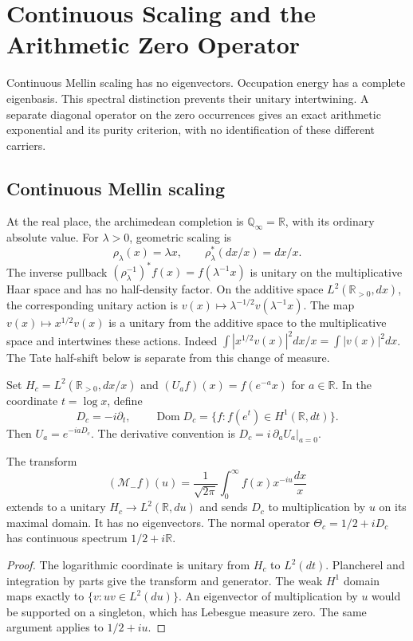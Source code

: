\chapter{Continuous Scaling and the Arithmetic Zero Operator}
\label{v4-arith:w9-r2:archimedean-wilson-surface}

Continuous Mellin scaling has no eigenvectors. Occupation energy has
a complete eigenbasis. This spectral distinction prevents their
unitary intertwining. A separate diagonal operator on the zero
occurrences gives an exact arithmetic exponential and its purity
criterion, with no identification of these different carriers.

\section{Continuous Mellin scaling}
At the real place, the archimedean completion is
\(\mathbb Q_\infty=\mathbb R\), with its ordinary absolute value.
For \(\lambda>0\), geometric scaling is
\begin{equation}
 \rho_\lambda(x)=\lambda x,\qquad
 \rho_\lambda^*(dx/x)=dx/x.
 \label{v4-arith:w9-r2:eq:scaling}
\end{equation}
The inverse pullback \((\rho_\lambda^{-1})^*f(x)=f(\lambda^{-1}x)\)
is unitary on the multiplicative Haar space and has no half-density factor. On the additive space \(L^2(\mathbb R_{>0},dx)\),
the corresponding unitary action is
\(v(x)\mapsto\lambda^{-1/2}v(\lambda^{-1}x)\).
The map \(v(x)\mapsto x^{1/2}v(x)\) is a unitary from the additive
space to the multiplicative space and intertwines these actions.
Indeed \(\int|x^{1/2}v(x)|^2dx/x=\int|v(x)|^2dx\).
The Tate half-shift below is separate from this change of measure.

\begin{definition}
\label{v4-arith:w9-r2:def:scaling}
Set $H_c=L^2(\mathbb R_{>0},dx/x)$ and
$(U_a f)(x)=f(e^{-a}x)$ for $a\in\mathbb R$.
In the coordinate $t=\log x$, define
\[
 D_c=-i\partial_t,\qquad
 \operatorname{Dom}D_c=\{f:f(e^t)\in H^1(\mathbb R,dt)\}.
\]
Then $U_a=e^{-iaD_c}$.
The derivative convention is $D_c=i\,\partial_a U_a|_{a=0}$.
\end{definition}

\begin{theorem}
\label{v4-arith:w9-r2:lem:mellin}
The transform
\[
 (\mathcal M_-f)(u)=\frac1{\sqrt{2\pi}}
                  \int_0^\infty f(x)x^{-iu}\frac{dx}{x}
\]
extends to a unitary $H_c\to L^2(\mathbb R,du)$ and sends $D_c$
to multiplication by $u$ on its maximal domain.
It has no eigenvectors. The normal operator
$\Theta_c=1/2+iD_c$ has continuous spectrum $1/2+i\mathbb R$.
\end{theorem}
\begin{proof}
The logarithmic coordinate is unitary from $H_c$ to $L^2(dt)$.
Plancherel and integration by parts give the transform and generator.
The weak $H^1$ domain maps exactly to $\{v:uv\in L^2(du)\}$.
An eigenvector of multiplication by $u$ would be supported on a
singleton, which has Lebesgue measure zero. The same argument applies
to $1/2+iu$.
\end{proof}

